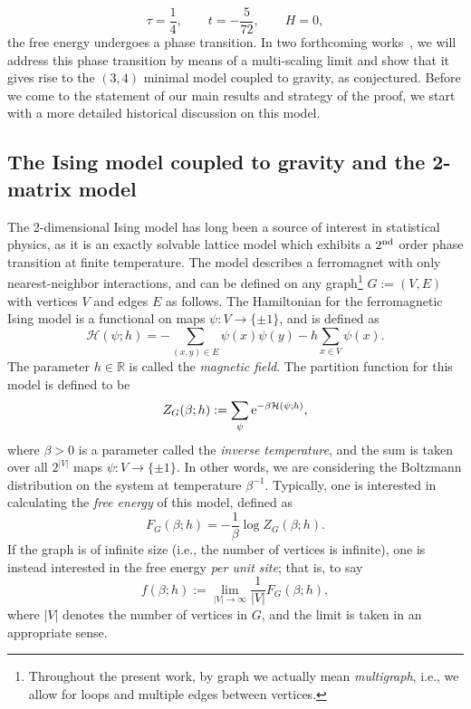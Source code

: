 \documentclass[pdftex]{sigma}
\numberwithin{equation}{section}
\begin{document}
 \begin{equation}\label{multicritical-point}
 \tau = \frac{1}{4},\qquad t = -\frac{5}{72}, \qquad H=0,
 \end{equation}
 the free energy undergoes a phase transition. In two forthcoming works~\cite{DHL3, DHL2}, we will address this phase transition by means of a multi-scaling limit and show that it gives rise to the $(3,4)$ minimal model coupled to gravity, as conjectured. Before we come to the statement of our main results and strategy of the proof, we start with a more detailed historical discussion on this model.


\subsection{The Ising model coupled to gravity and the 2-matrix model}
The 2-dimensional Ising model has long been a source of interest in statistical physics, as it is an exactly solvable lattice model which exhibits a $2^{\rm nd}$
order phase transition at finite temperature. The model describes a ferromagnet with only nearest-neighbor interactions, and can be defined on
any graph\footnote{Throughout the present work, by graph we actually mean \textit{multigraph}, i.e., we allow for loops and multiple edges between vertices.} $G := (V,E)$ with vertices $V$ and edges $E$ as follows. The Hamiltonian for the ferromagnetic Ising model is a functional on maps $\psi\colon V\to \{\pm 1\}$, and is defined as
 \begin{equation*}
 \mathcal{H}(\psi;h) = -\sum_{(x,y)\in E} \psi(x)\psi(y) - h \sum_{x\in V} \psi(x).
 \end{equation*}
The parameter $h \in \mathbb{R}$ is called the \textit{magnetic field}.
The partition function for this model is defined to be
 \begin{equation*} %
 Z_G(\beta;h) := \sum_{\psi} {\rm e}^{-\beta \mathcal{H}(\psi;h)},
 \end{equation*}
where $\beta > 0$ is a parameter called the \textit{inverse temperature}, and the sum is taken over all $2^{|V|}$ maps $\psi\colon V \to \{\pm 1\}$. In other words, we are considering the Boltzmann distribution on the system at temperature $\beta^{-1}$. Typically, one is interested in calculating the \textit{free energy} of this model, defined as
 \begin{equation*}
 F_G(\beta;h) = -\frac{1}{\beta} \log Z_G(\beta;h).
 \end{equation*}
If the graph is of infinite size (i.e., the number of vertices is infinite), one is instead interested in the free energy \textit{per unit site};
that is, to say
 \begin{equation*}
 f(\beta;h) := \lim_{|V|\to \infty} \frac{1}{|V|} F_G(\beta;h),
 \end{equation*}
where $|V|$ denotes the number of vertices in $G$, and the limit is taken in an appropriate sense.
\end{document}
